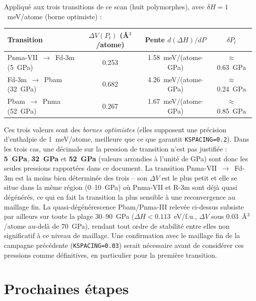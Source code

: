 \documentclass[11pt,a4paper]{article}
\begin{document}
Appliqué aux trois transitions de ce scan (huit polymorphes), avec $\delta H = 1$~meV/atome
(borne optimiste) :

\begin{center}
\begin{tabular}{lccc}
\toprule
Transition & $\Delta V(P_t)$ (\AA$^3$/atome) & Pente $d(\Delta H)/dP$ & $\delta P_t$ \\
\midrule
Pnma-VII~$\to$~Fd-3m (5~GPa) & 0.253 & 1.58~meV/(atome$\cdot$GPa) & $\approx$0.63~GPa \\
Fd-3m~$\to$~Pbam (32~GPa)    & 0.682 & 4.26~meV/(atome$\cdot$GPa) & $\approx$0.24~GPa \\
Pbam~$\to$~Pnma (52~GPa)     & 0.267 & 1.67~meV/(atome$\cdot$GPa) & $\approx$0.85~GPa \\
\bottomrule
\end{tabular}
\end{center}

Ces trois valeurs sont des \emph{bornes optimistes} (elles supposent une précision d'enthalpie de
1~meV/atome, meilleure que ce que garantit \texttt{KSPACING=0.2}). Dans les trois cas, une
décimale sur la pression de transition n'est pas justifiée : \textbf{5~GPa}, \textbf{32~GPa} et
\textbf{52~GPa} (valeurs arrondies à l'unité de GPa) sont donc les seules pressions rapportées
dans ce document. La transition Pnma-VII~$\to$~Fd-3m est la moins bien déterminée des trois --
son $\Delta V$ est le plus petit et elle se situe dans la même région (0--10~GPa) où Pnma-VII et
R-3m sont déjà quasi dégénérés, ce qui en fait la transition la plus sensible à une reconvergence
au maillage fin. La quasi-dégénérescence Pbam/Pnma-III relevée ci-dessus subsiste par ailleurs sur
toute la plage 30--90~GPa ($\Delta H < 0.113$~eV/f.u., $\Delta V$ sous 0.03~\AA$^3$/atome au-delà
de 70~GPa), rendant tout ordre de stabilité entre elles non significatif à ce niveau de maillage.
Une confirmation avec le maillage fin de la campagne précédente (\texttt{KSPACING=0.03}) serait
nécessaire avant de considérer ces pressions comme définitives, en particulier pour la première
transition.

\section{Prochaines étapes}
\end{document}
